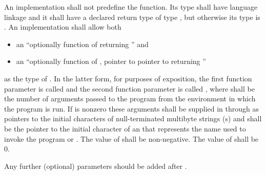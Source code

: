 \pnum
An implementation shall not predefine the  function.
Its type shall have \Cpp{} language linkage
and it shall have a declared return type of type
, but otherwise its type is .
%
An implementation shall allow both
\begin{itemize}
\item
an ``optionally  function of
\tcode{()} returning '' and
\item
an ``optionally  function of
, pointer to pointer to 
returning ''
\end{itemize}
%
%
as the type of .
%
%
In the latter form, for purposes of exposition, the first function
parameter is called  and the second function parameter is
called , where  shall be the number of
arguments passed to the program from the environment in which the
program is run. If
 is nonzero these arguments shall be supplied in
 through  as pointers to the initial
characters of null-terminated multibyte strings (\ntmbs{}s)
and  shall be the pointer to
the initial character of an \ntmbs{} that represents the name used to
invoke the program or . The value of  shall be
non-negative. The value of  shall be 0.

\recommended
Any further (optional) parameters should be added after .

